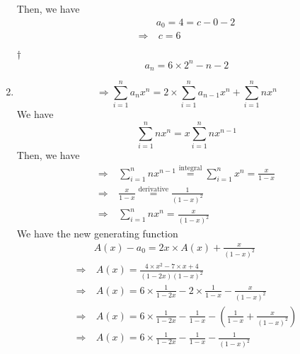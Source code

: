 \documentclass[a4paper,12pt]{article}
\begin{document}
\begin{enumerate}
\begin{equation}
    \end{equation} Then, we have \begin{equation}
        \begin{aligned}
            & a_0 = 4 = c - 0 - 2 \\
            \Rightarrow & \ c = 6
        \end{aligned}
    \end{equation}
    \begin{answer}{$\dag$}\begin{equation}
            a_n = 6 \times 2^n - n - 2            
        \end{equation}
    \end{answer}
    \item \begin{equation}
		\Rightarrow \sum_{i = 1}^n a_n x^n = 2 \times \sum_{i = 1}^n a_{n - 1}x^n + \sum_{i = 1}^n nx^n
	\end{equation} We have \begin{equation}
		\sum_{i = 1}^n nx^n = x\sum_{i = 1}^n nx^{n - 1}
	\end{equation} Then, we have \begin{equation}
		\begin{aligned}
			\Rightarrow & \ \sum_{i = 1}^n nx^{n - 1} \overset{\text{integral}}= \sum_{i = 1}^n x^n = \frac{x}{1 - x} \\
			\Rightarrow & \ \frac{x}{1 - x} \overset{\text{derivative}}= \frac{1}{(1 - x)^2} \\ 
			\Rightarrow & \ \sum_{i = 1}^n nx^n = \frac{x}{(1 - x)^2}
		\end{aligned}
	\end{equation} We have the new generating function \begin{equation}
		\begin{aligned}
			& A(x) - a_0 = 2x \times A(x) + \frac{x}{(1 - x)^2} \\
			\Rightarrow & \ A(x) = \frac{4 \times x^2 - 7 \times x + 4}{(1 - 2x)(1 - x)^2} \\
			\Rightarrow & \ A(x) = 6 \times \frac{1}{1 - 2x} - 2 \times \frac{1}{1 - x} - \frac{x}{(1 - x)^2} \\
			\Rightarrow & \ A(x) = 6 \times \frac{1}{1 - 2x} - \frac{1}{1 - x} - (\frac{1}{1 - x} + \frac{x}{(1 - x)^2}) \\
			\Rightarrow & \ A(x) = 6 \times \frac{1}{1 - 2x} - \frac{1}{1 - x} - \frac{1}{(1 - x)^2} \\
		\end{aligned}
	\end{equation}

\end{enumerate}
\end{document}
